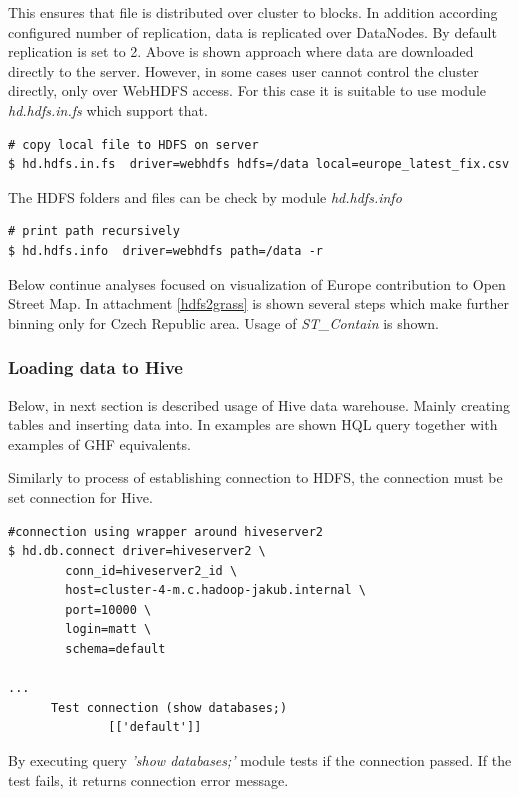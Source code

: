\documentclass[a4paper,12pt,oneside]{report}
\begin{document}
	This ensures that file is distributed over cluster to blocks. In addition
	according  configured number of replication, data is replicated over DataNodes.
	By default replication is set to 2.
	Above is shown approach where data are downloaded directly to the server.
	However, in some cases user cannot control the cluster directly, only over
	WebHDFS access. For this case it is suitable to use module \textit{hd.hdfs.in.fs}
	which support that.
	\begin{footnotesize}
		\begin{lstlisting}[style=python]
# copy local file to HDFS on server
$ hd.hdfs.in.fs  driver=webhdfs hdfs=/data local=europe_latest_fix.csv
		\end{lstlisting}
	\end{footnotesize}
	The HDFS folders and files can be check by module \textit{hd.hdfs.info}
	\begin{footnotesize}
		\begin{lstlisting}[style=python]
# print path recursively
$ hd.hdfs.info  driver=webhdfs path=/data -r
		\end{lstlisting}
	\end{footnotesize}
	
	Below continue analyses focused on visualization of Europe contribution to Open Street Map. 
	In attachment \ref{hdfs2grass} is shown several steps which make further binning only for Czech
	Republic area. Usage of \textit{ST\_Contain} is shown. 
	

\subsubsection{Loading data to Hive}
	Below, in next section is described usage of Hive data warehouse. Mainly
	creating tables and inserting data into. In examples are shown HQL query
	together with examples of GHF equivalents.
	
	Similarly to process of establishing connection to HDFS,
	 the connection must be set connection for Hive.
\begin{footnotesize}
	\begin{lstlisting}[style=python]
#connection using wrapper around hiveserver2
$ hd.db.connect driver=hiveserver2 \
		conn_id=hiveserver2_id \
		host=cluster-4-m.c.hadoop-jakub.internal \
		port=10000 \
		login=matt \
		schema=default 
	 		
...
      Test connection (show databases;) 
              [['default']]
		\end{lstlisting}
	\end{footnotesize}
	By executing query \textit{'show databases;'} module tests if the connection
	passed. If the test fails, it returns connection error message.
	
\end{document}
